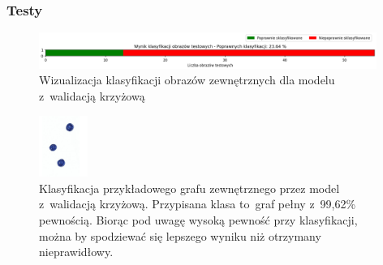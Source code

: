 \begin{frame}
    \frametitle{Testy}

    \begin{figure}[ht]
        \centering
        \includegraphics[width=11cm]{../thesis/resources/tests/images/v3/crossvalid_bar.png}
        \caption{Wizualizacja klasyfikacji obrazów zewnętrznych dla modelu z~walidacją krzyżową}
    \end{figure}
    
    \begin{figure}[ht]
        \centering
        \includegraphics[height=2cm]{../graph_classification/test_graphs/drawn/empty-1.png}
        \caption{Klasyfikacja przykładowego grafu zewnętrznego przez model z~walidacją krzyżową.
            Przypisana klasa to~graf pełny z~99,62\% pewnością.
            Biorąc pod uwagę wysoką pewność przy klasyfikacji,
            można by spodziewać się lepszego wyniku niż otrzymany nieprawidłowy.}
    \end{figure}

\end{frame}

